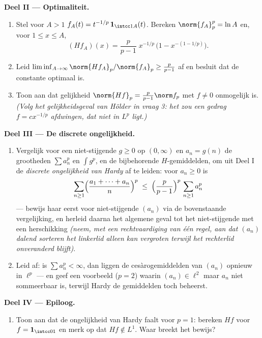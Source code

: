 \begin{problem}
\medskip
\noindent\textbf{Deel II --- Optimaliteit.}
\begin{enumerate}[resume]
  \item Stel voor $A > 1$ $f_A(t) = t^{-1/p}\,\mathbf
        1_{\intcc1A}(t)$. Bereken $\norm{f_A}_p^p = \ln A$ en,
        voor $1 \leq x \leq A$,
        \[
        (Hf_A)(x) = \frac p{p-1}\;x^{-1/p}\,
        \bigl(1 - x^{-(1 - 1/p)}\bigr).
        \]
  \item Leid $\liminf_{A\to\infty} \norm{Hf_A}_p/
        \norm{f_A}_p \geq \frac{p}{p-1}$ af en besluit dat de
        constante optimaal is.
  \item Toon aan dat gelijkheid $\norm{Hf}_p = \frac
        p{p-1}\norm f_p$ met $f \neq 0$ onmogelijk is.
        \emph{(Volg het gelijkheidsgeval van Hölder in vraag 3:
        het zou een gedrag $f = cx^{-1/p}$ afdwingen, dat niet
        in $L^p$ ligt.)}
\end{enumerate}

\medskip
\noindent\textbf{Deel III --- De discrete ongelijkheid.}
\begin{enumerate}[resume]
  \item Vergelijk voor een niet-stijgende $g \geq 0$ op
        $(0,\infty)$ en $a_n = g(n)$ de grootheden $\sum a_n^p$
        en $\int g^p$, en de bijbehorende $H$-gemiddelden, om
        uit Deel I de \emph{discrete ongelijkheid van Hardy}
        af te leiden: voor $a_n \geq 0$ is
        \[
        \sum_{n\geq1}\Bigl(\frac{a_1 + \dots +
        a_n}{n}\Bigr)^{p}
        \;\leq\;
        \Bigl(\frac{p}{p-1}\Bigr)^{p}\,\sum_{n\geq1}a_n^p
        \]
        --- bewijs haar eerst voor niet-stijgende $(a_n)$ via de
        bovenstaande vergelijking, en herleid daarna het
        algemene geval tot het niet-stijgende met een
        herschikking \emph{(neem, met een rechtvaardiging van
        één regel, aan dat $(a_n)$ dalend sorteren het
        linkerlid alleen kan vergroten terwijl het rechterlid
        onveranderd blijft)}.
  \item Leid af: is $\sum a_n^p < \infty$, dan liggen de
        cesàrogemiddelden van $(a_n)$ opnieuw in $\ell^p$ --- en
        geef een voorbeeld ($p = 2$) waarin $(a_n) \in \ell^2$
        maar $a_n$ niet sommeerbaar is, terwijl Hardy de
        gemiddelden toch beheerst.
\end{enumerate}

\medskip
\noindent\textbf{Deel IV --- Epiloog.}
\begin{enumerate}[resume]
  \item Toon aan dat de ongelijkheid van Hardy faalt voor $p =
        1$: bereken $Hf$ voor $f = \mathbf 1_{\intcc01}$ en
        merk op dat $Hf \notin L^1$. Waar breekt het bewijs?
\end{enumerate}


\end{problem}

